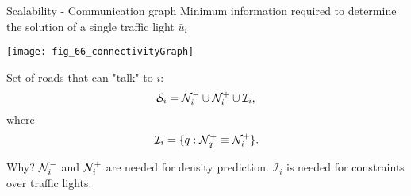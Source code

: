 \begin{frame}{Scalability - Communication graph}
    Minimum information required to determine the solution of a single traffic light $\bar{u}_i$
    \begin{center}
    \texttt{[image: fig\_66\_connectivityGraph]}
    \end{center}
    Set of roads that can "talk" to $i$:
    \[
    \mathcal{S}_i = \mathcal{N}^-_i\cup\mathcal{N}^+_i\cup\mathcal{I}_i,
    \]
    where
    \[
    \mathcal{I}_i = \{q: \mathcal{N}^+_q \equiv \mathcal{N}^+_i\}.
    \]
    
    \begin{block}{Why?}
    $\mathcal{N}^-_i$ and $\mathcal{N}^+_i$ are needed for density prediction.
    $\mathcal{I}_i$ is needed for constraints over traffic lights.
    \end{block}
\end{frame}
